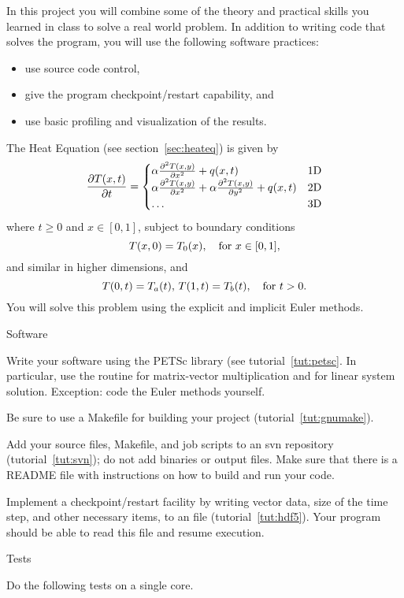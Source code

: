 In this project you will combine some of the theory and practical
skills you learned in class to solve a real world problem. In addition
to writing code that solves the program, you will use the following
software practices:
\begin{itemize}
  \item use source code control,
  \item give the program checkpoint/restart capability, and
  \item use basic profiling and visualization of the results.
\end{itemize}

The Heat Equation (see section~\ref{sec:heateq}) is given by
\[ \frac{\partial T(x,t)}{\partial t}=
\begin{cases}
  \alpha \frac{\partial^2 T(x,y)}{\partial x^2}+q(x,t)&\hbox{1D}\\
  \alpha \frac{\partial^2 T(x,y)}{\partial x^2}+
    \alpha \frac{\partial^2 T(x,y)}{\partial y^2}+q(x,t)&\hbox{2D}\\
    \ldots&\hbox{3D}
\end{cases}
\]
where $t\geq 0$ and $x\in[0,1]$, subject to boundary conditions
\[ T(x,0)=T_0(x),\quad\hbox{for $x\in[0,1]$}, \]
and similar in higher dimensions, and
\[ T(0,t)=T_a(t),\, T(1,t)=T_b(t),\quad\hbox{for $t>0$}. \]
You will solve this problem using the explicit and implicit Euler
methods.

 {Software}

Write your software using the PETSc library (see
tutorial~\ref{tut:petsc}. In particular, use the  routine
for matrix-vector multiplication and  for linear system
solution. Exception: code the Euler methods yourself.

Be sure to use a Makefile for building your project (tutorial~\ref{tut:gnumake}).

Add your source files, Makefile, and job scripts to an svn repository
(tutorial~\ref{tut:svn}); do not add binaries or output files. Make
sure that there is a README
file with instructions on how to build and run your code.

Implement a checkpoint/restart facility by writing vector data, size
of the time step, and other necessary items, to an  file
(tutorial~\ref{tut:hdf5}). Your program should be able to read this
file and resume execution.

 {Tests}

Do the following tests on a single core.

